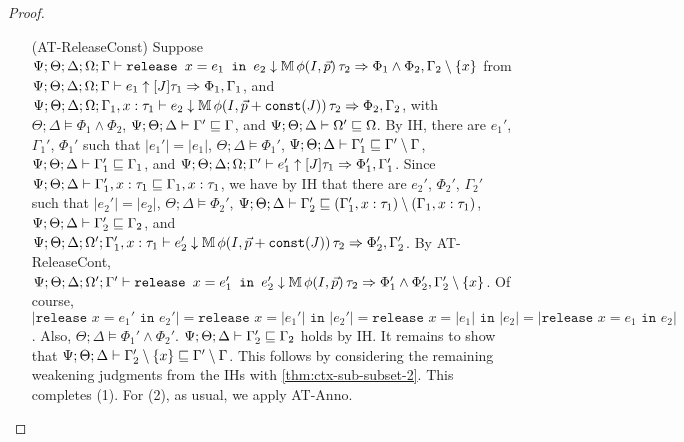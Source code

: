 \begin{proof}
\begin{itemize}
  \item[(AT-ReleaseConst)] Suppose
  $\Psi ; \Theta ; \Delta ; \Omega ; \Gamma \vdash \texttt{release } x = e_1 \texttt{ in }e_2 \downarrow \mathbb{M} \, \phi(I,\vec{p}) \, \tau_2 \Rightarrow \Phi_1 \wedge \Phi_2, \Gamma_2 \setminus \{x\}$ from
  $\Psi ; \Theta ; \Delta ; \Omega ; \Gamma \vdash e_1 \uparrow [J] \tau_1 \Rightarrow \Phi_1,\Gamma_1$, and
  $\Psi ; \Theta ; \Delta ; \Omega ; \Gamma_1, x : \tau_1 \vdash e_2 \downarrow \mathbb{M} \, \phi(I,\vec{p} + \texttt{const}(J)) \, \tau_2 \Rightarrow \Phi_2, \Gamma_2$, with
  $\Theta ; \Delta \vDash \Phi_1 \wedge \Phi_2$,
  $\Psi ; \Theta ; \Delta \vdash \Gamma' \sqsubseteq \Gamma$, and
  $\Psi ; \Theta ; \Delta \vdash \Omega' \sqsubseteq \Omega$.
  By IH, there are $e_1'$, $\Gamma_1'$, $\Phi_1'$ such that
  $|e_1'| = |e_1|$,
  $\Theta ; \Delta \vDash \Phi_1'$,
  $\Psi ; \Theta ; \Delta \vdash \Gamma_1' \sqsubseteq \Gamma' \setminus \Gamma$,
  $\Psi ; \Theta ; \Delta \vdash \Gamma_1' \sqsubseteq \Gamma_1$, and
  $\Psi ; \Theta ; \Delta ; \Omega ; \Gamma' \vdash e_1' \uparrow [J]\tau_1 \Rightarrow \Phi_1',\Gamma_1'$.
  Since $\Psi ; \Theta ; \Delta \vdash \Gamma_1',x : \tau_1 \sqsubseteq \Gamma_1, x : \tau_1$,
  we have by IH that there are $e_2'$, $\Phi_2'$, $\Gamma_2'$ such that
  $|e_2'| = |e_2|$,
  $\Theta ; \Delta \vDash \Phi_2'$,
  $\Psi ; \Theta ; \Delta \vdash \Gamma_2' \sqsubseteq (\Gamma_1',x : \tau_1) \setminus (\Gamma_1, x : \tau_1)$,
  $\Psi ; \Theta ; \Delta \vdash \Gamma_2' \sqsubseteq \Gamma_2$, and
  $\Psi ; \Theta ; \Delta ; \Omega' ; \Gamma_1', x : \tau_1 \vdash e_2' \downarrow \mathbb{M} \, \phi(I,\vec{p} + \texttt{const}(J)) \, \tau_2 \Rightarrow \Phi_2', \Gamma_2'$.
  By AT-ReleaseCont,
  $\Psi ; \Theta ; \Delta ; \Omega' ; \Gamma' \vdash \texttt{release } x = e_1' \texttt{ in }e_2' \downarrow \mathbb{M} \, \phi(I,\vec{p}) \, \tau_2 \Rightarrow \Phi_1' \wedge \Phi_2', \Gamma_2' \setminus \{x\}$.
  Of course, $|\texttt{release } x = e_1' \texttt{ in }e_2'| = \texttt{release } x = |e_1'| \texttt{ in }|e_2'| = \texttt{release } x = |e_1| \texttt{ in }|e_2|
  = |\texttt{release } x = e_1 \texttt{ in }e_2|$.
  Also, $\Theta ; \Delta \vDash \Phi_1' \wedge \Phi_2'$.
  $\Psi ; \Theta ; \Delta \vdash \Gamma_2' \sqsubseteq \Gamma_2$ holds by IH.
  It remains to show that $\Psi ; \Theta ; \Delta \vdash \Gamma_2' \setminus \{x\} \sqsubseteq \Gamma' \setminus \Gamma$.
  This follows by considering the remaining weakening judgments from the IHs with \autoref{thm:ctx-sub-subset-2}.
  This completes (1). For (2), as usual, we apply AT-Anno.
  

\end{itemize}
\end{proof}
